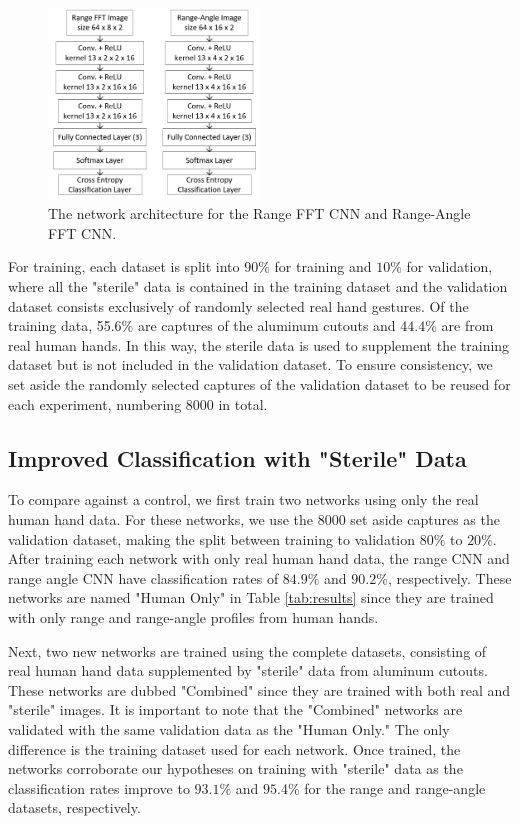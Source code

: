\documentclass{ieeeaccess}
\begin{document}
\begin{figure}[h]
    \centering
    \includegraphics[width=0.5\textwidth]{cnn_architectures.png}
    \caption{The network architecture for the Range FFT CNN and Range-Angle FFT CNN.}
    \label{fig:cnn_architectures}
\end{figure}

For training, each dataset is split into $90\%$ for training and $10\%$ for validation, where all the "sterile" data is contained in the training dataset and the validation dataset consists exclusively of randomly selected real hand gestures. Of the training data, 55.6\% are captures of the aluminum cutouts and $44.4\%$ are from real human hands. In this way, the sterile data is used to supplement the training dataset but is not included in the validation dataset. To ensure consistency, we set aside the randomly selected captures of the validation dataset to be reused for each experiment, numbering $8000$ in total.

\subsection{Improved Classification with "Sterile" Data}
\label{subsec:improved_classification_with_sterile_data}
To compare against a control, we first train two networks using only the real human hand data. For these networks, we use the $8000$ set aside captures as the validation dataset, making the split between training to validation $80\%$ to $20\%$. After training each network with only real human hand data, the range CNN and range angle CNN have classification rates of $84.9\%$ and $90.2\%$, respectively. These networks are named "Human Only" in Table \ref{tab:results} since they are trained with only range and range-angle profiles from human hands. 

Next, two new networks are trained using the complete datasets, consisting of real human hand data supplemented by "sterile" data from aluminum cutouts. These networks are dubbed "Combined" since they are trained with both real and "sterile" images. It is important to note that the "Combined" networks are validated with the same validation data as the "Human Only." The only difference is the training dataset used for each network. Once trained, the networks corroborate our hypotheses on training with "sterile" data as the classification rates improve to $93.1\%$ and $95.4\%$ for the range and range-angle datasets, respectively. 
\end{document}
